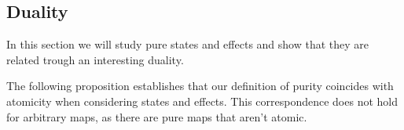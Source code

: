 \documentclass[a4paper,onecolumn,10pt,accepted=2019-05-03, issue=1, volume=1, shorttitle=papers/compositionality-1-1]{compositionalityarticle}
\numberwithin{counter}{section}
\begin{document}


\subsection{Duality}\label{sec:duality}
In this section we will study pure states and effects and show that they are related trough an interesting duality.

The following proposition establishes that our definition of purity coincides with atomicity when considering states and effects. This correspondence does not hold for arbitrary maps, as there are pure maps that aren't atomic.
\end{document}
